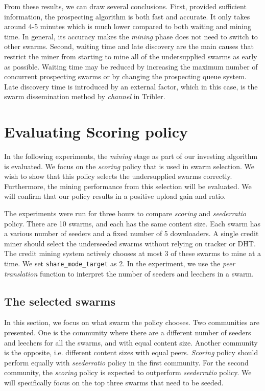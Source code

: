 From these results, we can draw several conclusions. First, provided sufficient information, the prospecting algorithm is both fast and accurate. It only takes around 4-5 minutes which is much lower compared to both waiting and mining time. In general, its accuracy makes the \textit{mining} phase does not need to switch to other swarms. Second, waiting time and late discovery are the main causes that restrict the miner from starting to mine all of the undersupplied swarms as early as possible. Waiting time may be reduced by increasing the maximum number of concurrent prospecting swarms or by changing the prospecting queue system. Late discovery time is introduced by an external factor, which in this case, is the swarm dissemination method by \textit{channel} in Tribler. 

\section{Evaluating Scoring policy}
\label{section:evalscoring}
In the following experiments, the \textit{mining} stage as part of our investing algorithm is evaluated. We focus on the \textit{scoring} policy that is used in swarm selection. We wish to show that this policy selects the undersupplied swarms correctly. Furthermore, the mining performance from this selection will be evaluated. We will confirm that our policy results in a positive upload gain and ratio. 

The experiments were run for three hours to compare \textit{scoring} and \textit{seederratio} policy. There are 10 swarms, and each has the same content size. Each swarm has a various number of seeders and a fixed number of 5 downloaders. A single credit miner should select the underseeded swarms without relying on tracker or DHT. The credit mining system actively chooses at most 3 of these swarms to mine at a time. We set \texttt{share\_mode\_target} as 2. In the experiment, we use the \textit{peer translation} function to interpret the number of seeders and leechers in a swarm. 

\subsection{The selected swarms}
In this section, we focus on what swarm the policy chooses. Two communities are presented. One is the community where there are a different number of seeders and leechers for all the swarms, and with equal content size. Another community is the opposite, i.e. different content sizes with equal peers. \textit{Scoring} policy should perform equally with \textit{seederratio} policy in the first community. For the second community, the \textit{scoring} policy is expected to outperform \textit{seederratio} policy. We will specifically focus on the top three swarms that need to be seeded.

